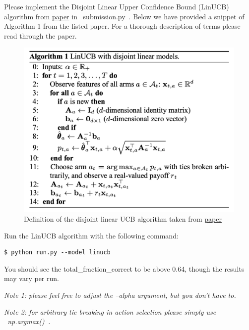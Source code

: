 \item {}

Please implement the Disjoint Linear Upper Confidence Bound (LinUCB) algorithm from \href{https://arxiv.org/pdf/1003.0146.pdf}{paper} in ~submission.py~. Below we have provided a snippet of Algorithm 1 from the listed paper. For a thorough description of terms please read through the paper.

\begin{figure}[H]
\centering
  \includegraphics[width=.5\linewidth]{images/linucb_algorithm.png}
  \caption{Definition of the disjoint linear UCB algorithm taken from \href{https://arxiv.org/pdf/1003.0146.pdf}{paper}}
\end{figure}

Run the LinUCB algorithm with the following command:

\begin{lstlisting}
$ python run.py --model linucb
\end{lstlisting}

You should see the total\_fraction\_correct to be above 0.64, though the results may vary per run.

\textit{Note 1: please feel free to adjust the --alpha argument, but you don't have to.}

\textit{Note 2: for arbitrary tie breaking in action selection please simply use ~np.argmax()~.}
